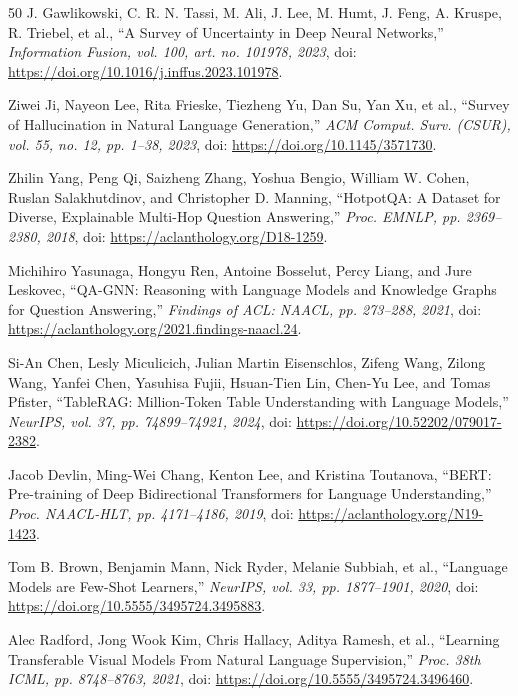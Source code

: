 \documentclass[conference,a4paper]{IEEEtran}
\begin{document}
\begin{thebibliography}{50}
 J. Gawlikowski, C. R. N. Tassi, M. Ali, J. Lee, M. Humt, J. Feng, A. Kruspe, R. Triebel, et al., ``A Survey of Uncertainty in Deep Neural Networks,'' \emph{Information Fusion, vol. 100, art. no. 101978, 2023}, doi: \url{https://doi.org/10.1016/j.inffus.2023.101978}.

 Ziwei Ji, Nayeon Lee, Rita Frieske, Tiezheng Yu, Dan Su, Yan Xu, et al., ``Survey of Hallucination in Natural Language Generation,'' \emph{ACM Comput. Surv. (CSUR), vol. 55, no. 12, pp. 1--38, 2023}, doi: \url{https://doi.org/10.1145/3571730}.

 Zhilin Yang, Peng Qi, Saizheng Zhang, Yoshua Bengio, William W. Cohen, Ruslan Salakhutdinov, and Christopher D. Manning, ``HotpotQA: A Dataset for Diverse, Explainable Multi-Hop Question Answering,'' \emph{Proc. EMNLP, pp. 2369--2380, 2018}, doi: \url{https://aclanthology.org/D18-1259}.

 Michihiro Yasunaga, Hongyu Ren, Antoine Bosselut, Percy Liang, and Jure Leskovec, ``QA-GNN: Reasoning with Language Models and Knowledge Graphs for Question Answering,'' \emph{Findings of ACL: NAACL, pp. 273--288, 2021}, doi: \url{https://aclanthology.org/2021.findings-naacl.24}.

 Si-An Chen, Lesly Miculicich, Julian Martin Eisenschlos, Zifeng Wang, Zilong Wang, Yanfei Chen, Yasuhisa Fujii, Hsuan-Tien Lin, Chen-Yu Lee, and Tomas Pfister, ``TableRAG: Million-Token Table Understanding with Language Models,'' \emph{NeurIPS, vol. 37, pp. 74899--74921, 2024}, doi: \url{https://doi.org/10.52202/079017-2382}.

 Jacob Devlin, Ming-Wei Chang, Kenton Lee, and Kristina Toutanova, ``BERT: Pre-training of Deep Bidirectional Transformers for Language Understanding,'' \emph{Proc. NAACL-HLT, pp. 4171--4186, 2019}, doi: \url{https://aclanthology.org/N19-1423}.

 Tom B. Brown, Benjamin Mann, Nick Ryder, Melanie Subbiah, et al., ``Language Models are Few-Shot Learners,'' \emph{NeurIPS, vol. 33, pp. 1877--1901, 2020}, doi: \url{https://doi.org/10.5555/3495724.3495883}.

 Alec Radford, Jong Wook Kim, Chris Hallacy, Aditya Ramesh, et al., ``Learning Transferable Visual Models From Natural Language Supervision,'' \emph{Proc. 38th ICML, pp. 8748--8763, 2021}, doi: \url{https://doi.org/10.5555/3495724.3496460}.


\end{thebibliography}
\end{document}
